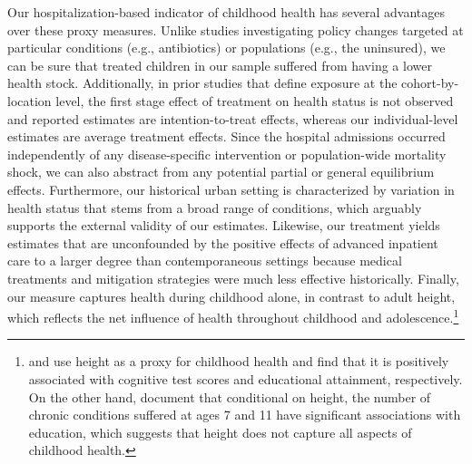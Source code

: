 \documentclass[12pt,english]{article}
\begin{document}
Our hospitalization-based indicator of childhood health has several advantages over these proxy measures. Unlike studies investigating policy changes targeted at particular conditions (e.g., antibiotics) or populations (e.g., the uninsured), we can be sure that treated children in our sample suffered from having a lower health stock. Additionally, in prior studies that define exposure at the cohort-by-location level, the first stage effect of treatment on health status is not observed and reported estimates are intention-to-treat effects, whereas our individual-level estimates are average treatment effects. Since the hospital admissions occurred independently of any disease-specific intervention or population-wide mortality shock, we can also abstract from any potential partial or general equilibrium effects. Furthermore, our historical urban setting is characterized by variation in health status that stems from a broad range of conditions, which arguably supports the external validity of our estimates. Likewise, our treatment yields estimates that are unconfounded by the positive effects of advanced inpatient care to a larger degree than contemporaneous settings because medical treatments and mitigation strategies were much less effective historically. Finally, our measure captures health during childhood alone, in contrast to adult height, which reflects the net influence of health throughout childhood and adolescence.\footnote{\cite{CasePaxson2008, CasePaxson2010} and \cite{Parman2015-JEH} use height as a proxy for childhood health and find that it is positively associated with cognitive test scores and educational attainment, respectively. On the other hand, \cite{CaseFertigPaxson2005} document that conditional on height, the number of chronic conditions suffered at ages 7 and 11 have significant associations with education, which suggests that height does not capture all aspects of childhood health.}
\end{document}

